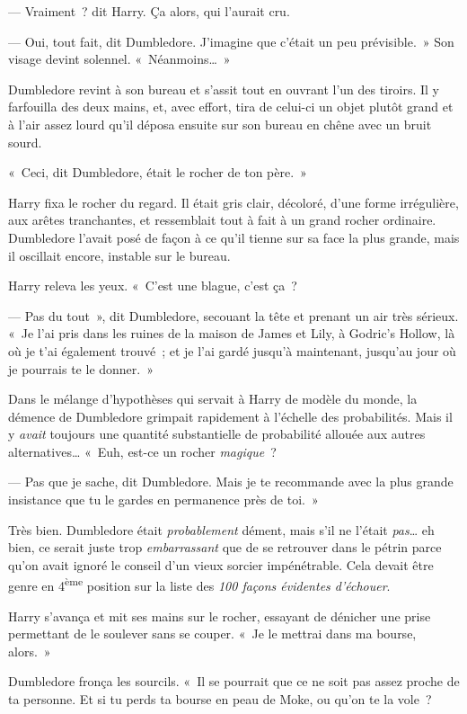 --- Vraiment~? dit Harry.
Ça alors, qui l'aurait cru.

--- Oui, tout fait, dit Dumbledore. J'imagine que c'était un peu prévisible.~»
Son visage devint solennel. «~Néanmoins…~»

Dumbledore revint à son bureau et s'assit tout en ouvrant l'un des tiroirs.
Il y farfouilla des deux mains, et, avec effort, tira de celui-ci un objet plutôt grand et à l'air assez lourd qu'il déposa ensuite sur son bureau en chêne avec un bruit sourd.

«~Ceci, dit Dumbledore, était le rocher de ton père.~»

Harry fixa le rocher du regard.
Il était gris clair, décoloré, d'une forme irrégulière, aux arêtes tranchantes, et ressemblait tout à fait à un grand rocher ordinaire.
Dumbledore l'avait posé de façon à ce qu'il tienne sur sa face la plus grande, mais il oscillait encore, instable sur le bureau.

Harry releva les yeux.
«~C'est une blague, c'est ça~?

--- Pas du tout~», dit Dumbledore, secouant la tête et prenant un air très sérieux.
«~Je l'ai pris dans les ruines de la maison de James et Lily, à Godric's Hollow, là où je t'ai également trouvé~; et je l'ai gardé jusqu'à maintenant, jusqu'au jour où je pourrais te le donner.~»

Dans le mélange d'hypothèses qui servait à Harry de modèle du monde, la démence de Dumbledore grimpait rapidement à l'échelle des probabilités.
Mais il y \emph{avait} toujours une quantité substantielle de probabilité allouée aux autres alternatives…
«~Euh, est-ce un rocher \emph{magique}~?

--- Pas que je sache, dit Dumbledore.
Mais je te recommande avec la plus grande insistance que tu le gardes en permanence près de toi.~»

Très bien.
Dumbledore était \emph{probablement} dément, mais s'il ne l'était \emph{pas}… eh bien, ce serait juste trop \emph{embarrassant} que de se retrouver dans le pétrin parce qu'on avait ignoré le conseil d'un vieux sorcier impénétrable.
Cela devait être genre en 4\textsuperscript{ème} position sur la liste des \emph{100 façons évidentes d'échouer}.

Harry s'avança et mit ses mains sur le rocher, essayant de dénicher une prise permettant de le soulever sans se couper.
«~Je le mettrai dans ma bourse, alors.~»

Dumbledore fronça les sourcils.
«~Il se pourrait que ce ne soit pas assez proche de ta personne.
Et si tu perds ta bourse en peau de Moke, ou qu'on te la vole~?

